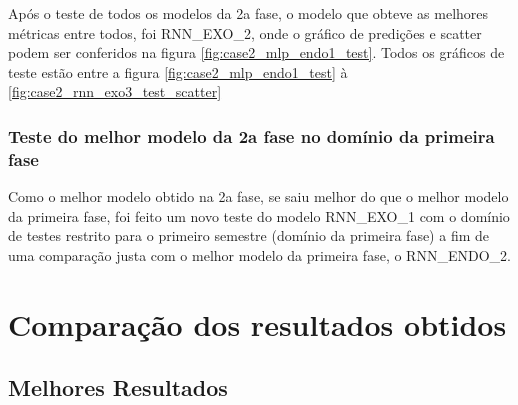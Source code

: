 \documentclass[	12pt, Times, openright, twoside, a4paper, english, brazil]{abntex2}
\begin{document}
            \begin{figure}[H]
            \end{figure}
            \begin{figure}[H]
\end{figure}
    	    Após o teste de todos os modelos da 2a fase, o modelo que obteve as melhores métricas entre todos, foi RNN\_EXO\_2, onde o gráfico de predições e scatter podem ser conferidos na figura \ref{fig:case2_mlp_endo1_test}.
    	    Todos os gráficos de teste estão entre a figura \ref{fig:case2_mlp_endo1_test} à \ref{fig:case2_rnn_exo3_test_scatter}
    	    \subsubsection{Teste do melhor modelo da 2a fase no domínio da primeira fase}
    	        
    	        
    	        Como o melhor modelo obtido na 2a fase, se saiu melhor do que o melhor modelo da primeira fase, foi feito um novo teste do modelo RNN\_EXO\_1 com o domínio de testes restrito para o primeiro semestre (domínio da primeira fase) a fim de uma comparação justa com o melhor modelo da primeira fase, o RNN\_ENDO\_2.
    	        
    
    \section{Comparação dos resultados obtidos }
        \subsection{Melhores Resultados}
\end{document}

